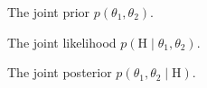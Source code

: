 \documentclass{article}
\newcommand{\given}{\mid}
\begin{document}
\begin{figure}
  \centering
  
  \caption{The joint prior $p(\theta_1, \theta_2)$.}
  \label{problem_joint_prior}
\end{figure}

\begin{figure}
  \centering
  
  \caption{The joint likelihood $p(\text{H} \given \theta_1, \theta_2)$.}
  \label{problem_joint_likelihood}
\end{figure}

\begin{figure}
  \centering
  
  \caption{The joint posterior $p(\theta_1, \theta_2 \given \text{H})$.}
  \label{problem_joint_posterior}
\end{figure}
\end{document}
